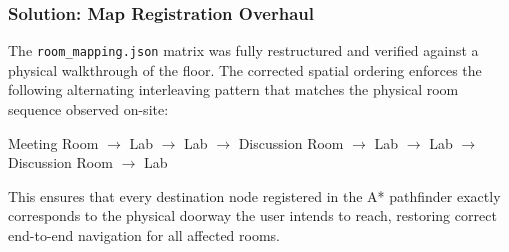 \documentclass[11pt,a4paper]{article}
\begin{document}
\subsubsection{Solution: Map Registration Overhaul}
The \texttt{room\_mapping.json} matrix was fully restructured and verified against a physical walkthrough of the floor. The corrected spatial ordering enforces the following alternating interleaving pattern that matches the physical room sequence observed on-site:
\begin{center}
Meeting Room $\rightarrow$ Lab $\rightarrow$ Lab $\rightarrow$ Discussion Room $\rightarrow$ Lab $\rightarrow$ Lab $\rightarrow$ Discussion Room $\rightarrow$ Lab
\end{center}
This ensures that every destination node registered in the A* pathfinder exactly corresponds to the physical doorway the user intends to reach, restoring correct end-to-end navigation for all affected rooms.
\end{document}
